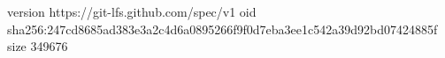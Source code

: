 version https://git-lfs.github.com/spec/v1
oid sha256:247cd8685ad383e3a2c4d6a0895266f9f0d7eba3ee1c542a39d92bd07424885f
size 349676
